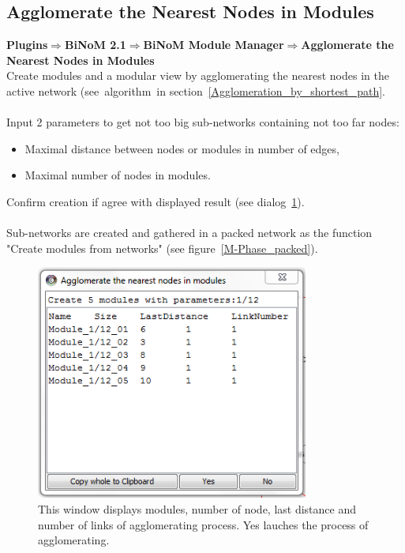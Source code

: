 \subsection{Agglomerate the Nearest Nodes in Modules}
\textbf{Plugins$\Rightarrow$BiNoM 2.1$\Rightarrow$BiNoM Module Manager$\Rightarrow$Agglomerate the Nearest Nodes in Modules}\\
Create modules and a modular view by agglomerating the nearest nodes in the active network (see~algorithm~in section~\ref{Agglomeration_by_shortest_path}.\\\\
Input 2 parameters to get not too big sub-networks containing not too far nodes:
\begin{itemize}
\item Maximal distance between nodes or modules in number of edges,
\item Maximal number of nodes in modules.
\end{itemize}
Confirm creation if agree with displayed result (see dialog~\ref{Agglomerate_in_modules_dialog}).\\\\
Sub-networks are created and gathered in a packed network as the function "Create modules from networks" (see figure~\ref{M-Phase_packed}).
\begin{figure}
\centering
\includegraphics[width=0.8\textwidth]{graphics/Agglomerate_in_modules_dialog}
\caption{This window displays modules, number of node, last distance and number of links of agglomerating process. Yes lauches the process of agglomerating.}
\label{Agglomerate_in_modules_dialog}
\end{figure}
